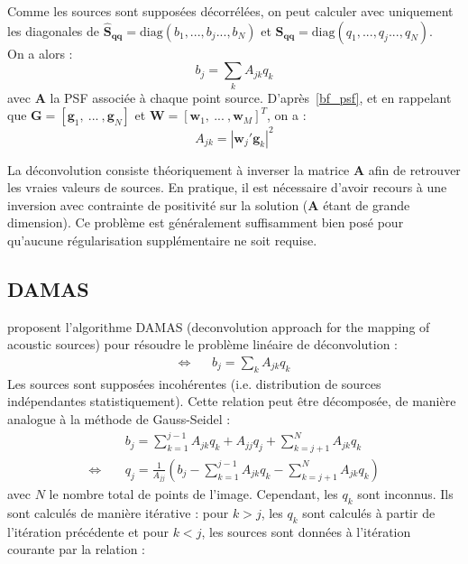 Comme les sources sont supposées décorrélées, on peut calculer avec uniquement les diagonales de  $\bm{\hat{S}_{qq}}=\text{diag}(b_1, ... , b_j...,b_N)$ et $\bm{S_{qq}}=\text{diag}(q_1, ... , q_j...,q_N)$.\\

On a alors : 
\begin{equation}
	b_j = \sum_k A_{jk}q_k
\end{equation}
avec  $\bm{A}$ la PSF associée à chaque point source. D'après~\ref{bf_psf}, et en rappelant que $\bm{G}=[\bm{g}_1,~...~,\bm{g}_N]$ et $\bm{W}=[\bm{w}_1,~...~,\bm{w}_M]^T$, on a : 
\begin{equation}
	A_{jk}=|\bm{w}_j'\bm{g}_k|^2
\end{equation}

La déconvolution consiste théoriquement à inverser la matrice $\bm{A}$ afin de retrouver les vraies valeurs de sources. En pratique, il est nécessaire d'avoir recours à une inversion avec contrainte de positivité sur la solution ($\bm{A}$ étant de grande dimension). Ce problème est généralement suffisamment bien posé pour qu'aucune régularisation supplémentaire ne soit requise.



\subsection{DAMAS}
 \cite{Brooks2006} proposent l'algorithme DAMAS (deconvolution approach for the mapping of acoustic sources) pour résoudre le problème linéaire de déconvolution : 
\begin{align}
	\Leftrightarrow~~~~ & b_j=\sum_k A_{jk}q_k
\end{align}
Les sources sont supposées incohérentes (i.e. distribution de sources indépendantes statistiquement).
Cette relation peut être décomposée, de manière analogue à la méthode de Gauss-Seidel : 
\begin{align}
	&b_j= \sum_{k=1}^{j-1}A_{jk}q_k + A_{jj}q_j + \sum_{k=j+1}^{N}A_{jk}q_k\\
	\Leftrightarrow~~~~~& q_j = \frac{1}{A_{jj}}\left( b_j - \sum_{k=1}^{j-1}A_{jk}q_k -  \sum_{k=j+1}^{N}A_{jk}q_k   \right)
\end{align}
avec $N$ le nombre total de points de l'image.
Cependant, les $q_k$ sont inconnus. Ils sont calculés de manière itérative : pour $k>j$, les $q_k$ sont calculés à partir de l'itération précédente et pour $k<j$, les sources sont données à l'itération courante par la relation : 

